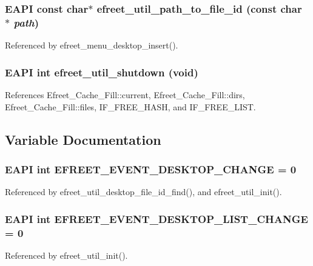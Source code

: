 \subsubsection[efreet\_\-util\_\-path\_\-to\_\-file\_\-id]{\setlength{\rightskip}{0pt plus 5cm}EAPI const char$\ast$ efreet\_\-util\_\-path\_\-to\_\-file\_\-id (const char $\ast$ {\em path})}\label{efreet__utils_8c_e499b43f751ef5d682a480b68ef07d4e}




Referenced by efreet\_\-menu\_\-desktop\_\-insert().
\subsubsection[efreet\_\-util\_\-shutdown]{\setlength{\rightskip}{0pt plus 5cm}EAPI int efreet\_\-util\_\-shutdown (void)}\label{efreet__utils_8c_3abde568cd48dbea047fbbe2e5d8da10}




References Efreet\_\-Cache\_\-Fill::current, Efreet\_\-Cache\_\-Fill::dirs, Efreet\_\-Cache\_\-Fill::files, IF\_\-FREE\_\-HASH, and IF\_\-FREE\_\-LIST.

\subsection{Variable Documentation}
\subsubsection[EFREET\_\-EVENT\_\-DESKTOP\_\-CHANGE]{\setlength{\rightskip}{0pt plus 5cm}EAPI int {\bf EFREET\_\-EVENT\_\-DESKTOP\_\-CHANGE} = 0}\label{efreet__utils_8c_a55b3b4b6ba75f010ab78a2f581aa043}




Referenced by efreet\_\-util\_\-desktop\_\-file\_\-id\_\-find(), and efreet\_\-util\_\-init().
\subsubsection[EFREET\_\-EVENT\_\-DESKTOP\_\-LIST\_\-CHANGE]{\setlength{\rightskip}{0pt plus 5cm}EAPI int {\bf EFREET\_\-EVENT\_\-DESKTOP\_\-LIST\_\-CHANGE} = 0}\label{efreet__utils_8c_e61719e5f6adda1ac511ccecfb56c1cf}




Referenced by efreet\_\-util\_\-init().